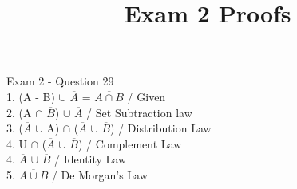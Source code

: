 \documentclass{article}
\title{Exam 2 Proofs}
\author{}
\date{}
\begin{document}
	\normalsize
	Exam 2 - Question 29 \\
	1. (A - B) $\cup$ $\overline{A}$ = $\overline{A \cap B}$ \quad / Given \\
	2. (A $\cap$ $\overline{B}$) $\cup$ $\overline{A}$ \qquad \quad \quad \space/ Set Subtraction law \\
	3. ($\overline{A}$ $\cup$ A) $\cap$ ($\overline{A}$ $\cup$ $\overline{B}$) \enspace \enspace / Distribution Law \\
	4. U $\cap$ ($\overline{A}$ $\cup$ $\overline{B}$) \qquad \quad \enspace / Complement Law \\
	4. $\overline{A}$ $\cup$ $\overline{B}$ \qquad \qquad \qquad / Identity Law \\
	5. $\overline{A \cup B}$  \qquad  \qquad \qquad / De Morgan's Law 
\end{document}
